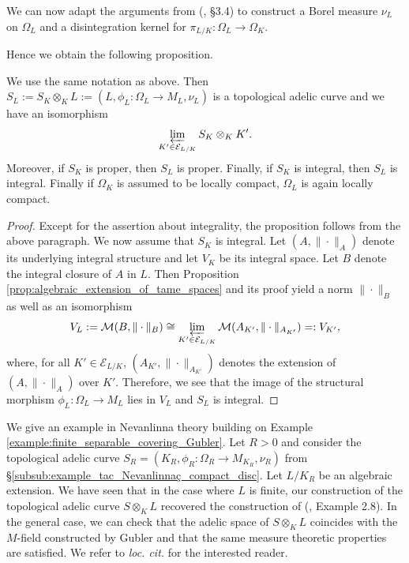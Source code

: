 \documentclass [11pt,reqno]{amsart}
\newcommand{\1}{\mathmybb{1}}
\def\cE{{\mathcal{E}}}
\def\cM{{\mathcal{M}}}
\begin{document}
We can now adapt the arguments from (\cite{ChenMori}, \S 3.4) to construct a Borel measure $\nu_L$ on $\Omega_L$ and a disintegration kernel for $\pi_{L/K} : \Omega_{L} \to \Omega_{K}$.

Hence we obtain the following proposition.

\begin{proposition}
\label{prop:algebraic_extension_tac}
We use the same notation as above. Then $S_L := S_K \otimes_K L := (L,\phi_{L}:\Omega_{L} \to M_{L},\nu_L)$ is a topological adelic curve and we have an isomorphism
\begin{align*}
\varprojlim_{K'\in\cE_{L/K}} S_K \otimes_K K'.
\end{align*}
Moreover, if $S_K$ is proper, then $S_L$ is proper. Finally, if $S_K$ is integral, then $S_L$ is integral. Finally if $\Omega_{K}$ is assumed to be locally compact, $\Omega_{L}$ is again locally compact.
\end{proposition}

\begin{proof}
Except for the assertion about integrality, the proposition follows from the above paragraph. We now assume that $S_K$ is integral. Let $(A,\|\cdot\|_A)$ denote its underlying integral structure and let $V_K$ be its integral space. Let $B$ denote the integral closure of $A$ in $L$. Then Proposition \ref{prop:algebraic_extension_of_tame_spaces} and its proof yield a norm $\|\cdot\|_{B}$ as well as an isomorphism 
\begin{align*}
V_L := \cM(B,\|\cdot\|_{B}) \cong \displaystyle\varprojlim_{K'\in \cE_{L/K}} \cM(A_{K'},\|\cdot\|_{A_{K'}}) =: V_{K'},
\end{align*}
where, for all $K'\in \cE_{L/K}$, $(A_{K'},\|\cdot\|_{A_{K'}})$ denotes the extension of $(A,\|\cdot\|_{A})$ over $K'$. Therefore, we see that the image of the structural morphism $\phi_L : \Omega_L \to M_L$ lies in $V_L$ and $S_L$ is integral.
\end{proof}

\begin{example}
\label{example:algebraic_covering_Gubler}
We give an example in Nevanlinna theory building on Example \ref{example:finite_separable_covering_Gubler}. Let $R>0$ and consider the topological adelic curve $S_{R}=(K_{R},\phi_{R}:\Omega_{R}\to M_{K_{R}},\nu_{R})$ from \S \ref{subsub:example_tac_Nevanlinnaç_compact_disc}. Let $L/K_{R}$ be an algebraic extension. We have seen that in the case where $L$ is finite, our construction of the topological adelic curve $S \otimes_{K} L$ recovered the construction of (\cite{Gubler97}, Example 2.8). In the general case, we can check that the adelic space of $S\otimes_{K} L$ coincides with the $M$-field constructed by Gubler and that the same measure theoretic properties are satisfied. We refer to \emph{loc. cit.} for the interested reader. 
\end{example}
\end{document}
